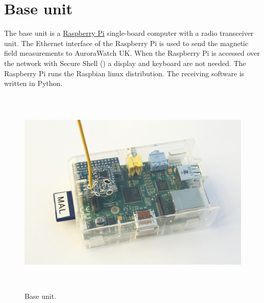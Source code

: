 \clearpage
\section{Base unit}

The base unit is a \href{http://www.raspberrypi.org/‎}{Raspberry Pi}
single-board computer with a radio transceiver unit. The Ethernet
interface of the Raspberry Pi is used to send the magnetic field
measurements to AuroraWatch UK. When the Raspberry Pi is accessed over
the network with Secure Shell (\ssh) a display and keyboard are not
needed. The Raspberry Pi runs the Raspbian linux distribution. The
receiving software is written in Python.

\begin{figure}[!h]
  \centering
  \includegraphics[keepaspectratio,height=10cm]{images/base-unit}
  \caption[Base unit]{%
    Base unit. }
  \label{fig:base-unit}
\end{figure}
